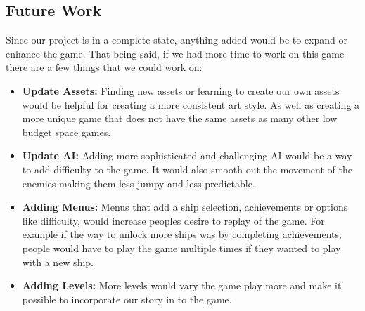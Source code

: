 \documentclass[12pt]{article}       %
\begin{document}
\subsection{Future Work}
Since our project is in a complete state, anything added would be to expand or enhance the game. That being said, if we had more time to work on this game there are a few things that we could work on:
\begin{itemize} 
	\item {\bf Update Assets:} Finding new assets or learning to create our own assets would be helpful for creating a more consistent art style. As well as creating a more unique game that does not have the same assets as many other low budget space games.  
	\item {\bf Update AI:} Adding more sophisticated and challenging AI would be a way to add difficulty to the game. It would also smooth out the movement of the enemies making them less jumpy and less predictable. 
	\item {\bf Adding Menus:} Menus that add a  ship selection, achievements or  options like difficulty, would increase peoples desire to replay of the game. For example if the way to unlock more ships was by completing achievements, people would have to play the game multiple times if they wanted to play with a new ship.
	\item {\bf Adding Levels:} More levels would vary the game play more and make it possible to incorporate our story in to the game. 
\end{itemize}






\newpage
\end{document}
